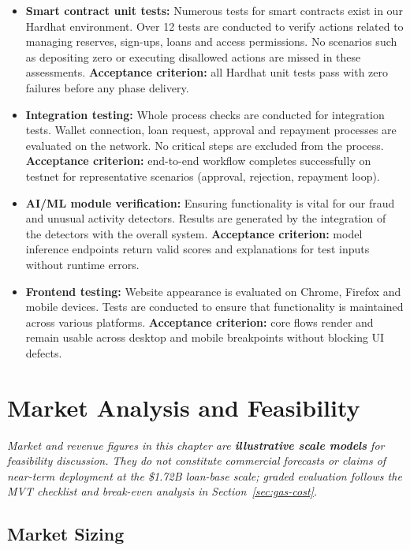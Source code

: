 \documentclass[12pt,a4paper]{report}
\begin{document}
\begin{itemize}[noitemsep]
\item \textbf{Smart contract unit tests:} Numerous tests for smart contracts exist in our Hardhat environment. Over 12 tests are conducted to verify actions related to managing reserves, sign-ups, loans and access permissions. No scenarios such as depositing zero or executing disallowed actions are missed in these assessments. \textbf{Acceptance criterion:} all Hardhat unit tests pass with zero failures before any phase delivery.
\item \textbf{Integration testing:} Whole process checks are conducted for integration tests. Wallet connection, loan request, approval and repayment processes are evaluated on the network. No critical steps are excluded from the process. \textbf{Acceptance criterion:} end-to-end workflow completes successfully on testnet for representative scenarios (approval, rejection, repayment loop).
\item \textbf{AI/ML module verification:} Ensuring functionality is vital for our fraud and unusual activity detectors. Results are generated by the integration of the detectors with the overall system. \textbf{Acceptance criterion:} model inference endpoints return valid scores and explanations for test inputs without runtime errors.
\item \textbf{Frontend testing:} Website appearance is evaluated on Chrome, Firefox and mobile devices. Tests are conducted to ensure that functionality is maintained across various platforms. \textbf{Acceptance criterion:} core flows render and remain usable across desktop and mobile breakpoints without blocking UI defects.
\end{itemize}


\chapter{Market Analysis and Feasibility}
\label{sec:market-feasibility-ch5}

\noindent\textit{Market and revenue figures in this chapter are \textbf{illustrative scale models} for feasibility discussion. They do not constitute commercial forecasts or claims of near-term deployment at the \$1.72B loan-base scale; graded evaluation follows the MVT checklist and break-even analysis in Section~\ref{sec:gas-cost}.}

\section{Market Sizing}
\end{document}

